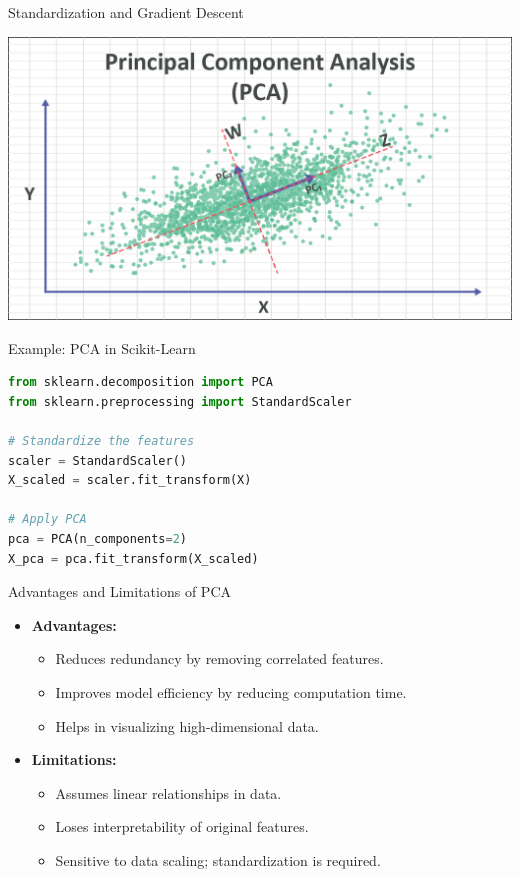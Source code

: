 \documentclass[11pt]{beamer}
\begin{document}
%
%
\begin{frame}{Standardization and Gradient Descent}
	\begin{center}
	\includegraphics[scale=.375]{../05-pictures/lesson-2-2_pic_6.png}
	\end{center}
\end{frame}
\begin{frame}[fragile]{Example: PCA in Scikit-Learn}
    \begin{lstlisting}[language=Python]
from sklearn.decomposition import PCA
from sklearn.preprocessing import StandardScaler

# Standardize the features
scaler = StandardScaler()
X_scaled = scaler.fit_transform(X)

# Apply PCA
pca = PCA(n_components=2)
X_pca = pca.fit_transform(X_scaled)
    \end{lstlisting}
\end{frame}
%
%
\begin{frame}{Advantages and Limitations of PCA}
    \begin{itemize}
        \item \textbf{Advantages:}
        \begin{itemize}
            \item Reduces redundancy by removing correlated features.
            \item Improves model efficiency by reducing computation time.
            \item Helps in visualizing high-dimensional data.
        \end{itemize}
        \item \textbf{Limitations:}
        \begin{itemize}
            \item Assumes linear relationships in data.
            \item Loses interpretability of original features.
            \item Sensitive to data scaling; standardization is required.
        \end{itemize}
    \end{itemize}
\end{frame}
\end{document}

